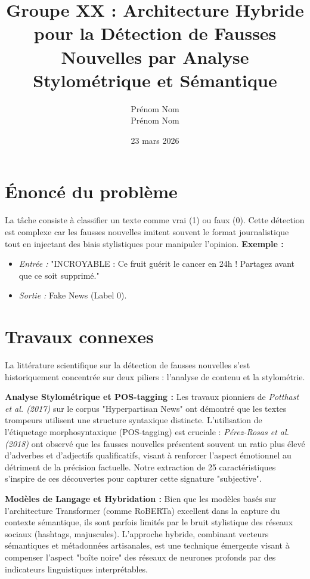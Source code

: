 \documentclass[11pt,twocolumn]{article}
\title{Groupe XX : Architecture Hybride pour la Détection de Fausses Nouvelles par Analyse Stylométrique et Sémantique}
\author{Prénom Nom \\ Prénom Nom}
\date{23 mars 2026}
\begin{document}
\maketitle

\section{Énoncé du problème}
La tâche consiste à classifier un texte comme vrai (1) ou faux (0). Cette détection est complexe car les fausses nouvelles imitent souvent le format journalistique tout en injectant des biais stylistiques pour manipuler l'opinion.
\textbf{Exemple :} 
\begin{itemize}
    \item \textit{Entrée :} "INCROYABLE : Ce fruit guérit le cancer en 24h ! Partagez avant que ce soit supprimé." 
    \item \textit{Sortie :} Fake News (Label 0). 
\end{itemize}

\section{Travaux connexes}
La littérature scientifique sur la détection de fausses nouvelles s'est historiquement concentrée sur deux piliers : l'analyse de contenu et la stylométrie.

\textbf{Analyse Stylométrique et POS-tagging :} Les travaux pionniers de \textit{Potthast et al. (2017)} sur le corpus "Hyperpartisan News" ont démontré que les textes trompeurs utilisent une structure syntaxique distincte. L'utilisation de l'étiquetage morphosyntaxique (POS-tagging) est cruciale : \textit{Pérez-Rosas et al. (2018)} ont observé que les fausses nouvelles présentent souvent un ratio plus élevé d'adverbes et d'adjectifs qualificatifs, visant à renforcer l'aspect émotionnel au détriment de la précision factuelle. Notre extraction de 25 caractéristiques s'inspire de ces découvertes pour capturer cette signature "subjective".

\textbf{Modèles de Langage et Hybridation :} Bien que les modèles basés sur l'architecture Transformer (comme RoBERTa) excellent dans la capture du contexte sémantique, ils sont parfois limités par le bruit stylistique des réseaux sociaux (hashtags, majuscules). L'approche hybride, combinant vecteurs sémantiques et métadonnées artisanales, est une technique émergente visant à compenser l'aspect "boîte noire" des réseaux de neurones profonds par des indicateurs linguistiques interprétables.
\end{document}

